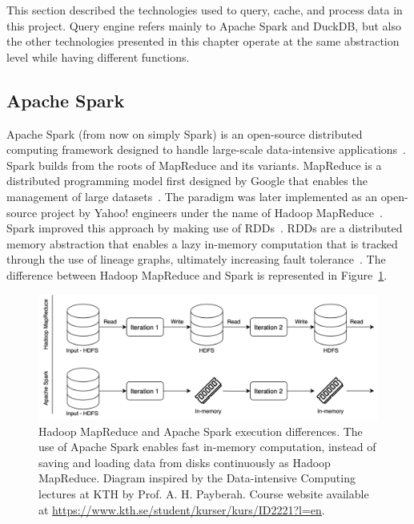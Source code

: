This section described the technologies used to query, cache, and process data in this project. Query engine refers mainly to Apache Spark and DuckDB, but also the other technologies presented in this chapter operate at the same abstraction level while having different functions.

\subsection{Apache Spark}

Apache Spark (from now on simply Spark) is an open-source distributed computing framework designed to handle large-scale data-intensive applications~\cite{zahariaApacheSparkUnified2016}. Spark builds from the roots of MapReduce and its variants. MapReduce is a distributed programming model first designed by Google that enables the management of large datasets~\cite{dean2004mapreduce}. The paradigm was later implemented as an open-source project by Yahoo! engineers under the name of Hadoop MapReduce~\cite{borthakurHadoopDistributedFile2005}. Spark improved this approach by making use of \glspl{RDD}~\cite{Zaharia:EECS-2011-82}. \glspl{RDD} are a distributed memory abstraction that enables a lazy in-memory computation that is tracked through the use of lineage graphs, ultimately increasing fault tolerance~\cite{Zaharia:EECS-2011-82}. The difference between Hadoop MapReduce and Spark is represented in Figure~\ref{fig:MapReducevsSpark}.

\begin{figure}[!ht]
  \begin{center}
    \includegraphics[width=\textwidth]{figures/2-background/Spark_MapReduce.png}
  \end{center}
  \caption[Hadoop MapReduce vs. Apache Spark]{Hadoop MapReduce and Apache Spark execution differences. The use of Apache Spark enables fast in-memory computation, instead of saving and loading data from disks continuously as Hadoop MapReduce. Diagram inspired by the Data-intensive Computing lectures at KTH by Prof. A. H. Payberah. Course website available at \url{https://www.kth.se/student/kurser/kurs/ID2221?l=en}.}
  \label{fig:MapReducevsSpark}
\end{figure}


